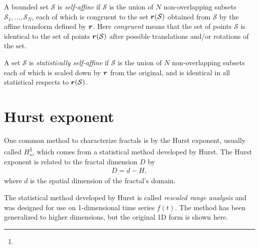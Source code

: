 A bounded set $\mathcal{S}$ is \emph{self-affine} if $\mathcal{S}$ is the union of $N$ non-overlapping subsets $\mathcal{S}_1, \dots, \mathcal{S}_N$, each of which is congruent to the set $\boldsymbol{r}(\mathcal{S})$ obtained from $\mathcal S$ by the affine transform defined by $\boldsymbol{r}$. Here \emph{congruent} means that the set of points $\mathcal{S}$ is identical to the set of points $\boldsymbol{r}(\mathcal{S})$ after possible translations and/or rotations of the set\cite{feder1988fractals}.

A set $\mathcal{S}$ is \emph{statistically self-affine} if $\mathcal{S}$ is the union of $N$ non-overlapping subsets each of which is scaled down by $\boldsymbol{r}$ from the original, and is identical in all statistical respects to $\boldsymbol{r}(\mathcal{S})$.

\section{Hurst exponent}

One common method to characterize fractals is by the Hurst exponent, usually called $H$\footnote{}, which comes from a statistical method developed by Hurst\cite{hurst1965longterm}\cite{hurst1951longterm}. The Hurst exponent is related to the fractal dimension $D$ by
\begin{align*}
    D = d-H,
\end{align*}
where $d$ is the spatial dimension of the fractal's domain\cite{feder1988fractals}.

The statistical method developed by Hurst is called \emph{rescaled range analysis} and was designed for use on 1-dimensional time series $f(t)$. The method has been generalized to higher dimensions\cite{fan2013rescaled}, but the original 1D form is shown here.

